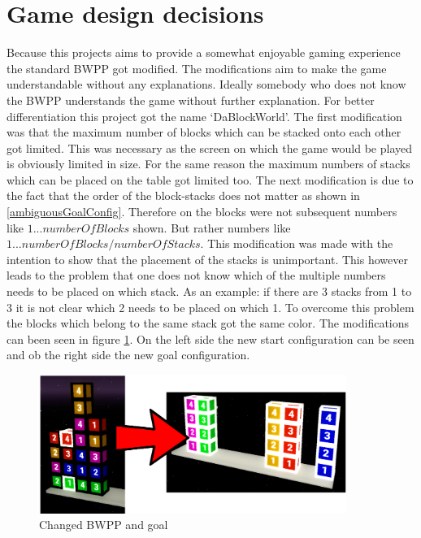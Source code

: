 \documentclass[runningheads]{llncs}
\begin{document}
    \section{Game design decisions}
        Because this projects aims to provide a somewhat enjoyable gaming experience the standard BWPP got modified.
        The modifications aim to make the game understandable without any explanations.
        Ideally somebody who does not know the BWPP understands the game without further explanation.
        For better differentiation this project got the name `DaBlockWorld'.\newline
        The first modification was that the maximum number of blocks which can be stacked onto each other got limited.
        This was necessary as the screen on which the game would be played is obviously limited in size.
        For the same reason the maximum numbers of stacks which can be placed on the table got limited too.\newline
        The next modification is due to the fact that the order of the block-stacks does not matter as shown in \ref{ambiguousGoalConfig}.
        Therefore on the blocks were not subsequent numbers like $1 ... numberOfBlocks$ shown.
        But rather numbers like $1 ... numberOfBlocks / numberOfStacks$.
        This modification was made with the intention to show that the placement of the stacks is unimportant.
        This however leads to the problem that one does not know which of the multiple numbers needs to be placed on which stack.
        As an example: if there are 3 stacks from 1 to 3 it is not clear which 2 needs to be placed on which 1.
        To overcome this problem the blocks which belong to the same stack got the same color.
        The modifications can been seen in figure \ref{colorizedGoal}.
        On the left side the new start configuration can be seen and ob the right side the new goal configuration.\newline
        
        \begin{figure}[h]
            \centering
            \includegraphics[width=10cm]{start_goal_config_colored.png}
            \caption{Changed BWPP and goal}
            \label{colorizedGoal}
        \end{figure} 
\end{document}
